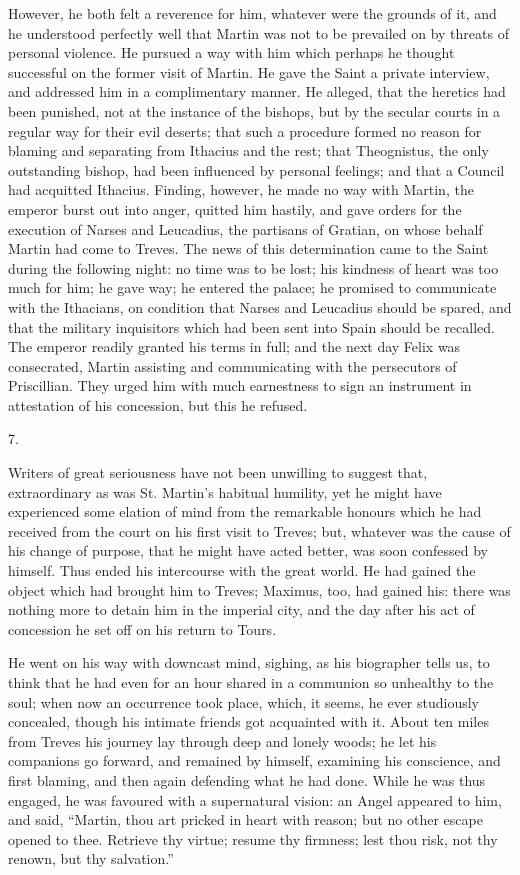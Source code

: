 However, he both felt a reverence for him, whatever were the
grounds of it, and he understood perfectly well that Martin was not to
be prevailed on by threats of personal violence. He pursued a way with
him which perhaps he thought successful on the former visit of Martin.
He gave the Saint a private interview, and addressed him in a
complimentary manner. He alleged, that the heretics had been punished,
not at the instance of the bishops, but by the secular courts in a
regular way for their evil deserts; that such a procedure formed no
reason for blaming and separating from Ithacius and the rest; that
Theognistus, the only outstanding bishop, had been influenced by
personal feelings; and that a Council had acquitted Ithacius. Finding,
however, he made no way with Martin, the emperor burst out into anger,
quitted him hastily, and gave orders for the execution of Narses and
Leucadius, the partisans of Gratian, on whose behalf Martin had come
to Treves. The news of this determination came to the Saint during the
following night: no time was to be lost; his kindness of heart was too
much for him; he gave way; he entered the palace; he promised to
communicate with the Ithacians, on condition that Narses and Leucadius
should be spared, and that the military inquisitors which had been
sent into Spain should be recalled. The emperor readily granted
his terms in full; and the next day Felix was consecrated, Martin
assisting and communicating with the persecutors of Priscillian. They
urged him with much earnestness to sign an instrument in attestation
of his concession, but this he refused.

7.

Writers of great seriousness have not been unwilling to suggest
that, extraordinary as was St. Martin's habitual humility, yet he
might have experienced some elation of mind from the remarkable
honours which he had received from the court on his first visit to
Treves; but, whatever was the cause of his change of purpose, that he
might have acted better, was soon confessed by himself. Thus ended his
intercourse with the great world. He had gained the object which had
brought him to Treves; Maximus, too, had gained his: there was nothing
more to detain him in the imperial city, and the day after his act of
concession he set off on his return to Tours.

He went on his way with downcast mind, sighing, as his biographer
tells us, to think that he had even for an hour shared in a communion
so unhealthy to the soul; when now an occurrence took place, which, it
seems, he ever studiously concealed, though his intimate friends got
acquainted with it. About ten miles from Treves his journey lay
through deep and lonely woods; he let his companions go forward, and
remained by himself, examining his conscience, and first blaming, and
then again defending what he had done. While he was thus engaged, he
was favoured with a supernatural vision: an Angel appeared to him, and
said, ``Martin, thou art pricked in heart with reason; but no
other escape opened to thee. Retrieve thy virtue; resume thy
firmness; lest thou risk, not thy renown, but thy salvation.''

